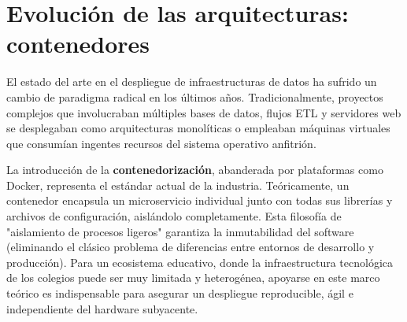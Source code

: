\section{Evolución de las arquitecturas: contenedores}
El estado del arte en el despliegue de infraestructuras de datos ha sufrido un cambio de paradigma radical en los últimos años. Tradicionalmente, proyectos complejos que involucraban múltiples bases de datos, flujos ETL y servidores web se desplegaban como arquitecturas monolíticas o empleaban máquinas virtuales que consumían ingentes recursos del sistema operativo anfitrión.

La introducción de la \textbf{contenedorización}, abanderada por plataformas como Docker, representa el estándar actual de la industria. Teóricamente, un contenedor encapsula un microservicio individual junto con todas sus librerías y archivos de configuración, aislándolo completamente. Esta filosofía de "aislamiento de procesos ligeros" garantiza la inmutabilidad del software (eliminando el clásico problema de diferencias entre entornos de desarrollo y producción). Para un ecosistema educativo, donde la infraestructura tecnológica de los colegios puede ser muy limitada y heterogénea, apoyarse en este marco teórico es indispensable para asegurar un despliegue reproducible, ágil e independiente del hardware subyacente.
